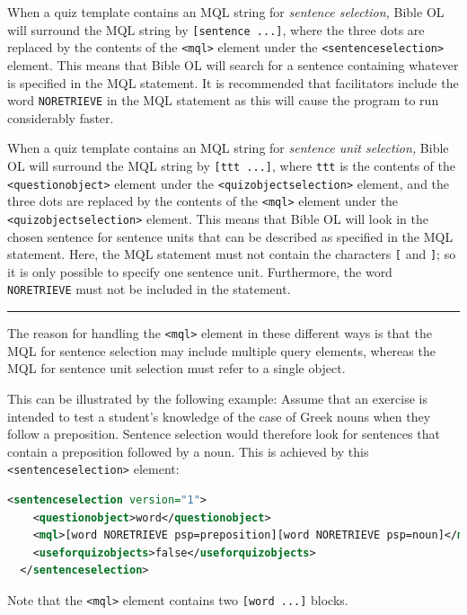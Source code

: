 \documentclass[11pt,oneside,a4paper]{memoir}
\newcommand*{\xml}[1]{\texttt{<#1>}}
\begin{document}
When a quiz template contains an MQL string for \emph{sentence selection,} Bible OL will surround
the MQL string by \texttt{[sentence ...]}, where the three dots are replaced by the contents of the
\xml{mql} element under the \xml{sentenceselection} element. This means that Bible OL will search
for a sentence containing whatever is specified in the MQL statement. It is recommended that
facilitators include the word \texttt{NORETRIEVE} in the MQL statement as this
will cause the program to run considerably faster.

When a quiz template contains an MQL string for \emph{sentence unit selection,}
Bible OL will surround the MQL string by \texttt{[ttt ...]}, where \texttt{ttt} is the contents of
the \xml{questionobject} element under the \xml{quizobjectselection} element, and the three dots are
replaced by the contents of the \xml{mql} element under the \xml{quizobjectselection} element. This
means that Bible OL will look in the chosen sentence for sentence units that can be described as
specified in the MQL statement. Here, the MQL statement must not contain the characters \texttt{[}
  and \texttt{]}; so it is only possible to specify one sentence unit. Furthermore, the word
\texttt{NORETRIEVE} must not be included in the statement.

\pfbreak

The reason for handling the \xml{mql} element in these different ways is that the MQL for sentence
selection may include multiple query elements, whereas the MQL for sentence unit selection must
refer to a single object.

This can be illustrated by the following example: Assume that an exercise is intended to test a
student's knowledge of the case of Greek nouns when they follow a preposition. Sentence selection
would therefore look for sentences that contain a preposition followed by a noun. This is achieved
by this \xml{sentenceselection}\index{sentenceselection@\xml{sentenceselection}} element:

\begin{lstlisting}[language=XML]
  <sentenceselection version="1">
    <questionobject>word</questionobject>
    <mql>[word NORETRIEVE psp=preposition][word NORETRIEVE psp=noun]</mql>
    <useforquizobjects>false</useforquizobjects>
  </sentenceselection>
\end{lstlisting}

Note that the \xml{mql} element contains two \texttt{[word~...]} blocks.
\end{document}
